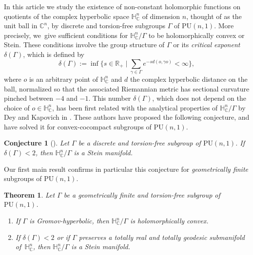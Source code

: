 \documentclass[JEP,XML,SOM,Unicode,NoEqCountersInSection,published]{cedram}
\newenvironment{enumeratea}
{\bgroup\def\theenumi{\alph{enumi}}
\begin{enumerate}}
{\end{enumerate}\egroup}
\let\ts\textstyle
\newtheorem{theoremIntro}{Theorem}
\newtheorem*{conjecture*}{Conjecture}
\theoremstyle{definition}
\newcommand{\C}{\mathbb{C}}
\newcommand{\R}{\mathbb{R}}
\newcommand{\HNC}{\mathbb{H}^{n}_{\C}}
\newcommand{\PU}{\mathrm{PU}}
\def\C{\mathbb{C}}
\newcommand{\HNC}{\mathbb{H}^{n}_{\C}}
\newcommand{\PU}{\mathrm{PU}}
\begin{document}
\maketitle
\vspace*{-\baselineskip}
\tableofcontents
\mainmatter

In this article we study the existence of non-constant holomorphic functions on quotients of the complex hyperbolic space $\HNC$ of dimension $n$, thought of as the unit ball in $\C^{n}$, by discrete and torsion-free subgroups $\Gamma$ of $\PU(n,1)$. More precisely, we~give sufficient conditions for $\HNC/\Gamma$ to be holomorphically convex or Stein. These conditions involve the group structure of $\Gamma$ or its \textit{critical exponent} $\delta(\Gamma)$, which is defined by\begin{equation}\label{eq-def-delta}
\delta(\Gamma):= \ts\inf \bigl\{s \in \R_{+} \mid \sum_{\gamma \in \Gamma}e^{-sd(o,\gamma o)}< \infty\bigr\},
\end{equation}
where $o$ is an arbitrary point of $\HNC$ and $d$ the complex hyperbolic distance on the ball, normalized so that the associated Riemannian metric has sectional curvature pinched between $-4$ and $-1$. This number $\delta(\Gamma)$, which does not depend on the choice of $o\in \HNC$, has been first related with the analytical properties of $\HNC/\Gamma$ by Dey and Kapovich in \cite{deyNoteComplexhyperbolicKleinian2020}. These authors have proposed the following conjecture, and have solved it for convex-cocompact subgroups of $\PU(n,1)$.

\begin{conjecture*}[{\cite{deyNoteComplexhyperbolicKleinian2020}}]
Let $\Gamma$ be a discrete and torsion-free subgroup of $\PU(n,1)$. If $\delta(\Gamma)<2$, then $\HNC/\Gamma$ is a Stein manifold.
\end{conjecture*}

Our first main result confirms in particular this conjecture for \textit{geometrically finite }subgroups of $\PU(n,1)$.

\begin{theoremIntro}\label{thm-geom-fini-delta-stein}
Let $\Gamma$ be a geometrically finite and torsion-free subgroup of $\PU(n,1)$.
\begin{enumeratea}
\item\label{thm-geom-fini-delta-steina} If $\Gamma$ is Gromov-hyperbolic, then $\HNC/\Gamma$ is holomorphically convex.
\item\label{thm-geom-fini-delta-steinb} If $\delta(\Gamma)<2$ or if $\Gamma$ preserves a totally real and totally geodesic submanifold of~$\HNC$, then $\HNC/\Gamma$ is a Stein manifold.
\end{enumeratea}
\end{theoremIntro}
\end{document}
